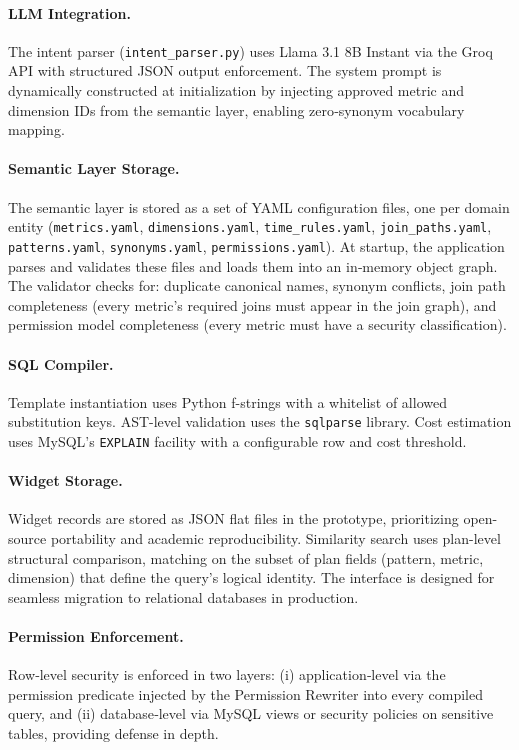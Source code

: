 \documentclass[11pt]{article}
\begin{document}
\paragraph{LLM Integration.} The intent parser (\texttt{intent_parser.py}) uses Llama 3.1 8B Instant via the Groq API with structured JSON output enforcement. The system prompt is dynamically constructed at initialization by injecting approved metric and dimension IDs from the semantic layer, enabling zero‑synonym vocabulary mapping.

\paragraph{Semantic Layer Storage.} The semantic layer is stored as a set of YAML configuration files, one per domain entity (\texttt{metrics.yaml}, \texttt{dimensions.yaml}, \texttt{time\_rules.yaml}, \texttt{join\_paths.yaml}, \texttt{patterns.yaml}, \texttt{synonyms.yaml}, \texttt{permissions.yaml}). At startup, the application parses and validates these files and loads them into an in‑memory object graph. The validator checks for: duplicate canonical names, synonym conflicts, join path completeness (every metric's required joins must appear in the join graph), and permission model completeness (every metric must have a security classification).

\paragraph{SQL Compiler.} Template instantiation uses Python f-strings with a whitelist of allowed substitution keys. AST-level validation uses the \texttt{sqlparse} library. Cost estimation uses MySQL's \texttt{EXPLAIN} facility with a configurable row and cost threshold.

\paragraph{Widget Storage.} Widget records are stored as JSON flat files in the prototype, prioritizing open-source portability and academic reproducibility. Similarity search uses plan-level structural comparison, matching on the subset of plan fields (pattern, metric, dimension) that define the query's logical identity. The interface is designed for seamless migration to relational databases in production.

\paragraph{Permission Enforcement.} Row‑level security is enforced in two layers: (i) application‑level via the permission predicate injected by the Permission Rewriter into every compiled query, and (ii) database‑level via MySQL views or security policies on sensitive tables, providing defense in depth.
\end{document}
